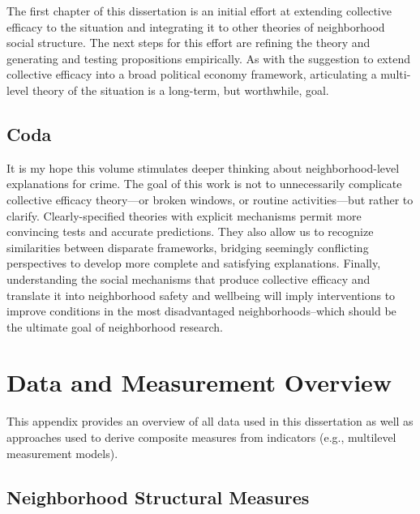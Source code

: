 \documentclass [11pt, proquest] {uwthesis}[2015/03/03]
\begin{document}
The first chapter of this dissertation is an initial effort at extending collective efficacy to the situation and integrating it to other theories of neighborhood social structure. The next steps for this effort are refining the theory and generating and testing propositions empirically. As with the suggestion to extend collective efficacy into a broad political economy framework, articulating a multi-level theory of the situation is a long-term, but worthwhile, goal.

\hypertarget{coda}{%
\section{Coda}\label{coda}}

It is my hope this volume stimulates deeper thinking about neighborhood-level explanations for crime. The goal of this work is not to unnecessarily complicate collective efficacy theory---or broken windows, or routine activities---but rather to clarify. Clearly-specified theories with explicit mechanisms permit more convincing tests and accurate predictions. They also allow us to recognize similarities between disparate frameworks, bridging seemingly conflicting perspectives to develop more complete and satisfying explanations. Finally, understanding the social mechanisms that produce collective efficacy and translate it into neighborhood safety and wellbeing will imply interventions to improve conditions in the most disadvantaged neighborhoods--which should be the ultimate goal of neighborhood research.

\appendix

\hypertarget{measures}{%
\chapter{Data and Measurement Overview}\label{measures}}

This appendix provides an overview of all data used in this dissertation as well as approaches used to derive composite measures from indicators (e.g., multilevel measurement models).

\hypertarget{neighborhood-structural-measures}{%
\section{Neighborhood Structural Measures}\label{neighborhood-structural-measures}}
\end{document}
